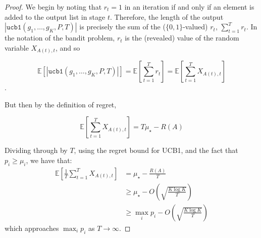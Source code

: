 \documentclass[sigconf,nonacm,review,anonymous]{acmart}
\begin{document}
\regretthm*
\begin{proof}
We begin by noting that $r_t = 1$ in an iteration if and only if an element is added to the output list in stage $t$. Therefore, the length of the output $\left|\texttt{ucb1}(g_1,\dots,g_K,P,T)\right|$ is precisely the sum of the ($\{0,1\}$-valued) $r_t$, $\sum_{t=1}^T r_t$. In the notation of the bandit problem, $r_t$ is the (revealed) value of the random variable $X_{A(t),t}$, and so 

$$\mathbb{E}\left[\left|\texttt{ucb1}(g_1,\dots,g_K,P,T)\right|\right] = \mathbb{E}\left[\sum_{t=1}^T r_t\right] = \mathbb{E}\left[\sum_{t=1}^T X_{A(t),t}\right]$$.

But then by the definition of regret,

$$
\mathbb{E}\left[\sum_{t=1}^T X_{A(t),t}\right] = T\mu_{\star} - R(A)
$$

Dividing through by $T$, using the regret bound for UCB1, and the fact that $p_i \geq \mu_i$, we have that:
\begin{align*}
\mathbb{E}\left[\frac{1}{T}\sum_{t=1}^T X_{A(t),t}\right] &= \mu_\star - \frac{R(A)}{T}\\
&\geq \mu_{\star} - O\left(\sqrt{\frac{K\log K}{T}}\right)\\
&\geq \max_i p_i - O\left(\sqrt{\frac{K\log K}{T}}\right)
\end{align*}
which approaches $\max_i p_i$ as $T \to \infty$.
\end{proof}
\end{document}

